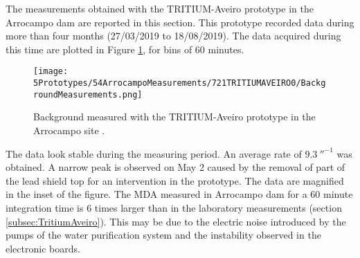 
The measurements obtained with the TRITIUM-Aveiro prototype in the Arrocampo dam are reported in this section. This prototype recorded data during more than four months (27/03/2019 to 18/08/2019). The data acquired during this time are plotted in Figure \ref{fig:BackgroundArrocampoAveiro}, for bins of 60 minutes.
\begin{figure}[h]
\centering
\texttt{[image: 5Prototypes/54ArrocampoMeasurements/721TRITIUMAVEIRO0/BackgroundMeasurements.png]}
\caption{Background measured with the TRITIUM-Aveiro prototype in the Arrocampo site \cite{ExperimentalPaperCarlos}.\label{fig:BackgroundArrocampoAveiro}}
\end{figure}
The data look stable during the measuring period. An average rate of $9.3~\second^{-1}$ was obtained. A narrow peak is observed on May 2 caused by the removal of part of the lead shield top for an intervention in the prototype. The data are magnified in the inset of the figure. The MDA measured in Arrocampo dam for a 60 minute integration time is 6 times larger than in the laboratory measurements (section \ref{subsec:TritiumAveiro}). This may be due to the electric noise introduced by the pumps of the water purification system and the instability observed in the electronic boards.

